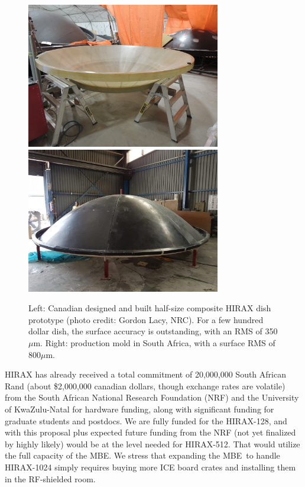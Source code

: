\documentclass[letterpaper,11pt,preprint]{aastex}
\newcommand{\mbe}{{\rm MBE}}
\begin{document}
\begin{figure}[tbh]
  \includegraphics[height=2.5in]{3m_dish.jpg}
  \includegraphics[height=2.5in]{mms_mold.jpg}
\caption{\small Left:  Canadian designed and built half-size composite
  HIRAX dish prototype (photo credit: Gordon Lacy, NRC).  For a few
  hundred dollar dish, the surface accuracy is outstanding, with an
  RMS of 350$\mu$m.  Right: production mold in South Africa, with a
  surface RMS of 800$\mu$m.
  \label{fig:hirax_dishes}
}
\end{figure}


HIRAX has already received a total commitment of 20,000,000 South
African Rand (about \$2,000,000 canadian dollars, though exchange
rates are volatile) from the South African National Research
Foundation (NRF) and the University of KwaZulu-Natal for hardware
funding, along with significant funding for graduate students and
postdocs.  We are fully funded for the HIRAX-128, and with this
proposal plus expected future funding from the NRF (not yet finalized
by highly likely) would be at the level needed for HIRAX-512.  That
would utilize the full capacity of the \mbe.  We stress that expanding
the \mbe\ to handle HIRAX-1024 simply requires buying more ICE board
crates and installing them in the RF-shielded room.  
\end{document}
